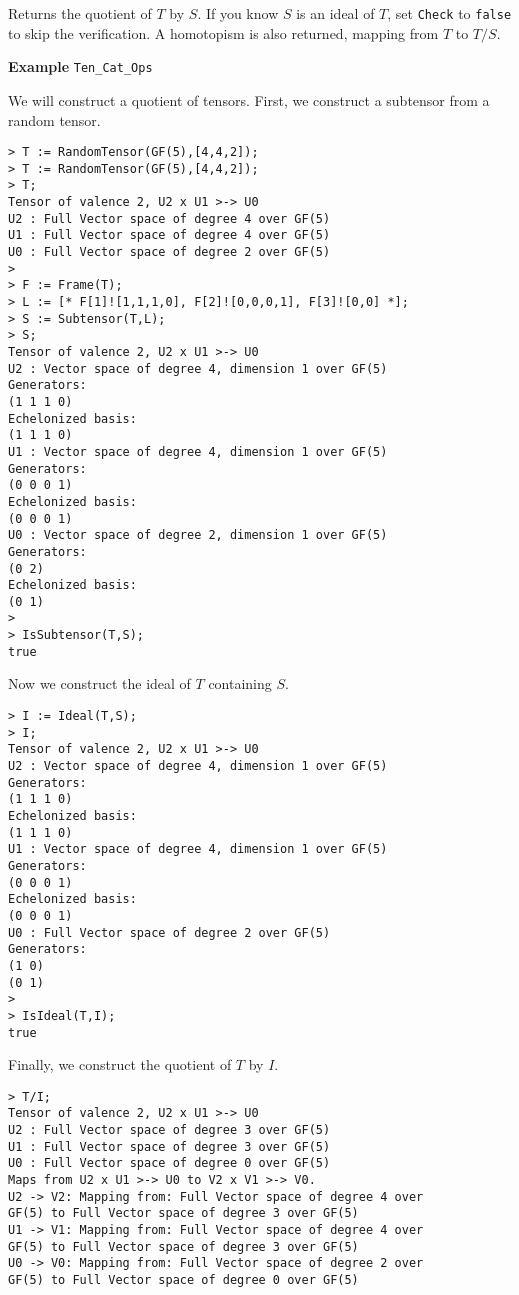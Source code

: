 Returns the quotient of $T$ by $S$. If you know $S$ is an ideal of $T$, 
set {\tt Check} to {\tt false} to skip the verification.
A homotopism is also returned, mapping from $T$ to $T/S$.

\begin{framed}{\bf Example} {\tt Ten\_Cat\_Ops}\\
{\small We will construct a quotient of tensors. First, we construct a subtensor from a random tensor.
\begin{lstlisting}[frame=single,basicstyle=\ttfamily\color{black!30!
teal},backgroundcolor=\color{white!70!gray}]
> T := RandomTensor(GF(5),[4,4,2]);
> T := RandomTensor(GF(5),[4,4,2]);
> T;
Tensor of valence 2, U2 x U1 >-> U0
U2 : Full Vector space of degree 4 over GF(5)
U1 : Full Vector space of degree 4 over GF(5)
U0 : Full Vector space of degree 2 over GF(5)
> 
> F := Frame(T);
> L := [* F[1]![1,1,1,0], F[2]![0,0,0,1], F[3]![0,0] *];
> S := Subtensor(T,L);
> S;
Tensor of valence 2, U2 x U1 >-> U0
U2 : Vector space of degree 4, dimension 1 over GF(5)
Generators:
(1 1 1 0)
Echelonized basis:
(1 1 1 0)
U1 : Vector space of degree 4, dimension 1 over GF(5)
Generators:
(0 0 0 1)
Echelonized basis:
(0 0 0 1)
U0 : Vector space of degree 2, dimension 1 over GF(5)
Generators:
(0 2)
Echelonized basis:
(0 1)
> 
> IsSubtensor(T,S);
true
\end{lstlisting}
Now we construct the ideal of $T$ containing $S$.
\begin{lstlisting}[frame=single,basicstyle=\ttfamily\color{black!30!
teal},backgroundcolor=\color{white!70!gray}]
> I := Ideal(T,S);
> I;
Tensor of valence 2, U2 x U1 >-> U0
U2 : Vector space of degree 4, dimension 1 over GF(5)
Generators:
(1 1 1 0)
Echelonized basis:
(1 1 1 0)
U1 : Vector space of degree 4, dimension 1 over GF(5)
Generators:
(0 0 0 1)
Echelonized basis:
(0 0 0 1)
U0 : Full Vector space of degree 2 over GF(5)
Generators:
(1 0)
(0 1)
> 
> IsIdeal(T,I);
true
\end{lstlisting}
Finally, we construct the quotient of $T$ by $I$.
\begin{lstlisting}[frame=single,basicstyle=\ttfamily\color{black!30!
teal},backgroundcolor=\color{white!70!gray}]
> T/I;
Tensor of valence 2, U2 x U1 >-> U0
U2 : Full Vector space of degree 3 over GF(5)
U1 : Full Vector space of degree 3 over GF(5)
U0 : Full Vector space of degree 0 over GF(5)
Maps from U2 x U1 >-> U0 to V2 x V1 >-> V0.
U2 -> V2: Mapping from: Full Vector space of degree 4 over 
GF(5) to Full Vector space of degree 3 over GF(5)
U1 -> V1: Mapping from: Full Vector space of degree 4 over 
GF(5) to Full Vector space of degree 3 over GF(5)
U0 -> V0: Mapping from: Full Vector space of degree 2 over 
GF(5) to Full Vector space of degree 0 over GF(5)
\end{lstlisting}
}
\end{framed}

